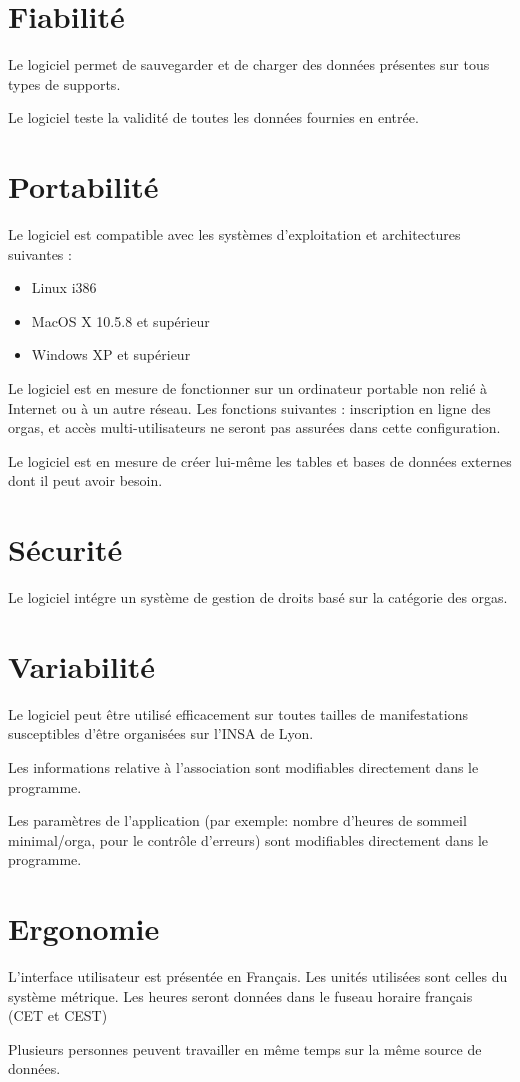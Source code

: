 \section{Fiabilité}

Le logiciel permet de sauvegarder et de charger des données présentes sur tous types de supports.

Le logiciel teste la validité de toutes les données fournies en entrée.

\section{Portabilité}
Le logiciel est compatible avec les systèmes d'exploitation et architectures suivantes : 
\begin{itemize}
\item Linux i386
\item MacOS X 10.5.8 et supérieur
\item Windows XP et supérieur
\end{itemize}

Le logiciel est en mesure de fonctionner sur un ordinateur portable non relié à Internet ou à un autre réseau. 
Les fonctions suivantes : inscription en ligne des orgas, et accès multi-utilisateurs ne seront pas assurées dans cette configuration.

Le logiciel est en mesure de créer lui-même les tables et bases de données externes dont il peut avoir besoin.


\section{Sécurité}
Le logiciel intégre un système de gestion de droits basé sur la catégorie des orgas.


\section{Variabilité}
Le logiciel peut être utilisé efficacement sur toutes tailles de manifestations susceptibles d'être organisées sur l'INSA de Lyon.

Les informations relative à l'association sont modifiables directement dans le programme.

Les paramètres de l'application (par exemple: nombre d'heures de sommeil minimal/orga, pour le contrôle d'erreurs) sont modifiables directement dans le programme.

\section{Ergonomie}
L'interface utilisateur est présentée en Français. Les unités utilisées sont celles du système métrique. Les heures seront données dans le fuseau horaire français (CET et CEST)

Plusieurs personnes peuvent travailler en même temps sur la même source de données.


